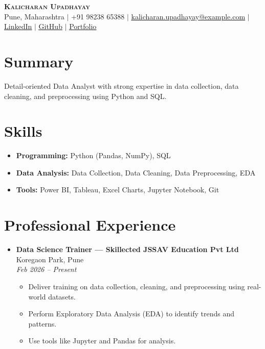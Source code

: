 \documentclass[letterpaper,10.8pt]{article}
\begin{document}
\begin{center}
    \textbf{\Huge \scshape Kalicharan Upadhayay} \\ \vspace{1pt}
    \small Pune, Maharashtra $|$ +91 98238 65388 $|$ \href{mailto:kalicharan.upadhayay@example.com}{\underline{kalicharan.upadhayay@example.com}} $|$ \href{https://www.linkedin.com/in/kalicharan-upadhayay-2637b4324}{\underline{LinkedIn}} $|$ \href{https://github.com/akashupadhayay106-au}{\underline{GitHub}} $|$ \href{https://akashupadhayay106-au.github.io/portfolio-with-chatbot/}{\underline{Portfolio}}
\end{center}

\section{Summary}
Detail-oriented Data Analyst with strong expertise in data collection, data cleaning, and preprocessing using Python and SQL.

\section{Skills}
\begin{itemize}[leftmargin=0.15in]
    \item \textbf{Programming:} Python (Pandas, NumPy), SQL
    \item \textbf{Data Analysis:} Data Collection, Data Cleaning, Data Preprocessing, EDA
    \item \textbf{Tools:} Power BI, Tableau, Excel Charts, Jupyter Notebook, Git
\end{itemize}

\section{Professional Experience}
\begin{itemize}[leftmargin=0.15in, label={}]

    \item
    \textbf{Data Science Trainer --- Skillected JSSAV Education Pvt Ltd} \hfill Koregaon Park, Pune \\
    \textit{Feb 2026 -- Present}
    \begin{itemize}
        \item Deliver training on data collection, cleaning, and preprocessing using real-world datasets.
        \item Perform Exploratory Data Analysis (EDA) to identify trends and patterns.
        \item Use tools like Jupyter and Pandas for analysis.
    \end{itemize}

\end{itemize}
\end{document}
